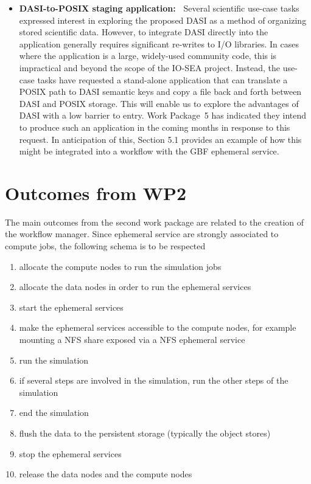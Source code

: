 \begin{itemize}
    \item \textbf{DASI-to-POSIX staging application:~} Several scientific use-case tasks expressed interest in
    exploring the proposed DASI as a method of organizing stored scientific data. However, to integrate DASI
    directly into the application generally requires significant re-writes to I/O libraries. In cases where the
    application is a large, widely-used community code, this is impractical and beyond the scope of the IO-SEA
    project. Instead, the use-case tasks have requested a stand-alone application that can translate a POSIX path
    to DASI semantic keys and copy a file back and forth between DASI and POSIX storage. This will enable us to
    explore the advantages of DASI with a low barrier to entry. Work Package~5 has indicated they intend to
    produce such an application in the coming months in response to this request. In anticipation of this,
    Section 5.1 provides an example of how this might be integrated into a workflow with the GBF ephemeral
    service.
\end{itemize}


\section{Outcomes from WP2}

The main outcomes from the second work package are related to the creation of the workflow manager. Since
ephemeral service are strongly associated to compute jobs, the following schema is to be respected
\begin{enumerate}
    \item allocate the compute nodes to run the simulation jobs
    \item allocate the data nodes in order to run the ephemeral services
    \item start the ephemeral services
    \item make the ephemeral services accessible to the compute nodes, for example mounting a NFS share
    exposed via a NFS ephemeral service
    \item run the simulation
    \item if several steps are involved in the simulation, run the other steps of the simulation
    \item end the simulation
    \item flush the data to the persistent storage (typically the object stores)
    \item stop the ephemeral services
    \item release the data nodes and the compute nodes
\end{enumerate}

